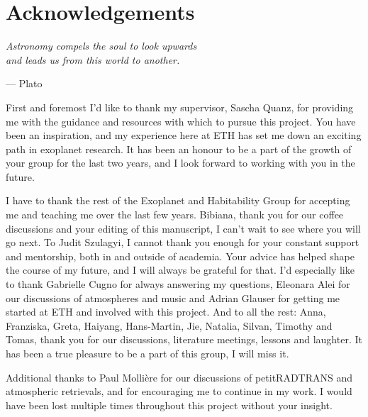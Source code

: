 

\chapter*{Acknowledgements}

\begin{flushright}
{\itshape
Astronomy compels the soul to look upwards \\and leads us from this world to another.}

\vspace{0.5em}
--- Plato
\end{flushright}

First and foremost I'd like to thank my supervisor, Sascha Quanz, for providing me with the guidance and resources with which to pursue this project.
You have been an inspiration, and my experience here at ETH has set me down an exciting path in exoplanet research.
It has been an honour to be a part of the growth of your group for the last two years, and I look forward to working with you in the future.

I have to thank the rest of the Exoplanet and Habitability Group for accepting me and teaching me over the last few years. 
Bibiana, thank you for our coffee discussions and your editing of this manuscript, I can't wait to see where you will go next.
To Judit Szulagyi, I cannot thank you enough for your constant support and mentorship, both in and outside of academia. 
Your advice has helped shape the course of my future, and I will always be grateful for that.
I'd especially like to  thank Gabrielle Cugno for always answering my questions, Eleonara Alei for our discussions of atmospheres and music and Adrian Glauser for getting me started at ETH and involved with this project.
And to all the rest: Anna, Franziska, Greta, Haiyang, Hans-Martin, Jie, Natalia, Silvan, Timothy and Tomas, thank you for our discussions, literature meetings, lessons and laughter. 
It has been a true pleasure to be a part of this group, I will miss it.

Additional thanks to Paul Molli\`{e}re for our discussions of petitRADTRANS and atmospheric retrievals, and for encouraging me to continue in my work.
I would have been lost multiple times throughout this project without your insight.

